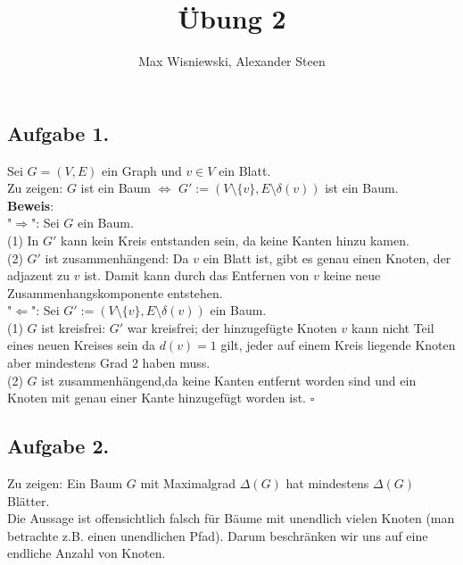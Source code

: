 \documentclass[11pt,a4paper,ngerman]{article}
\date{}
\title{Übung 2}
\author{Max Wisniewski, Alexander Steen}
\begin{document}

\renewcommand{\figurename}{Figure}

\maketitle
\thispagestyle{fancy}

\subsection*{Aufgabe 1.}
Sei $G = (V,E)$ ein Graph und $v \in V$ ein Blatt. \\
Zu zeigen: $G$ ist ein Baum $\Leftrightarrow$ $G' := (V \setminus \{v \}, E \setminus \delta(v))$ ist ein Baum. \\
\textbf{Beweis}:\\
"$\Rightarrow$": Sei $G$ ein Baum.\\
(1) In $G'$ kann kein Kreis entstanden sein, da keine Kanten hinzu kamen.\\
(2) $G'$ ist zusammenhängend: Da $v$ ein Blatt ist, gibt es genau einen Knoten, der adjazent zu $v$ ist.
Damit kann durch das Entfernen von $v$ keine neue Zusammenhangskomponente entstehen. 
\\
"$\Leftarrow$": Sei $G' := (V \setminus \{v \}, E \setminus \delta(v))$ ein Baum. \\
(1) $G$ ist kreisfrei: $G'$ war kreisfrei; der hinzugefügte Knoten $v$ kann nicht Teil eines
neuen Kreises sein da $d(v)=1$ gilt, jeder auf einem Kreis liegende Knoten aber mindestens Grad 2 haben muss.\\
(2) $G$ ist zusammenhängend,da keine Kanten entfernt worden sind und ein Knoten mit genau einer Kante hinzugefügt worden ist.
\mbox{}\hfill$\square$

\subsection*{Aufgabe 2.}
Zu zeigen: Ein Baum $G$ mit Maximalgrad $\Delta(G)$ hat mindestens $\Delta(G)$ Blätter.\\
Die Aussage ist offensichtlich falsch für Bäume mit unendlich vielen Knoten (man betrachte z.B.
einen unendlichen Pfad). Darum beschränken wir uns auf eine endliche Anzahl von Knoten.
\end{document}
